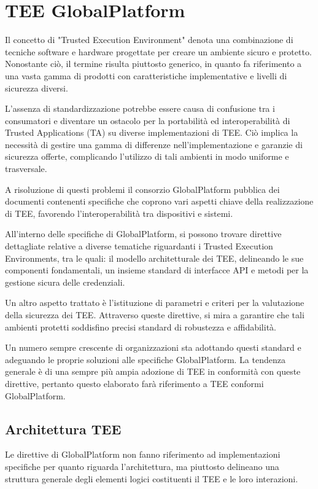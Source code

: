 \documentclass[12pt,italian]{report}
\begin{document}
	\newpage
	
	\section{TEE GlobalPlatform}
	\label{sec:GlobalPlatform}
	Il concetto di "Trusted Execution Environment" denota una combinazione di tecniche software e hardware progettate per creare un ambiente sicuro e protetto. Nonostante ciò, il termine risulta piuttosto generico, in quanto fa riferimento a una vasta gamma di prodotti con caratteristiche implementative e livelli di sicurezza diversi.
	
	L'assenza di standardizzazione potrebbe essere causa di confusione tra i consumatori e diventare un ostacolo per la portabilità ed interoperabilità di Trusted Applications (TA) su diverse implementazioni di TEE. Ciò implica la necessità di gestire una gamma di differenze nell'implementazione e garanzie di sicurezza offerte, complicando l'utilizzo di tali ambienti in modo uniforme e trasversale.
	
	A risoluzione di questi problemi il consorzio GlobalPlatform pubblica dei documenti contenenti specifiche che coprono vari aspetti chiave della realizzazione di TEE, favorendo l'interoperabilità tra dispositivi e sistemi.
	
	All'interno delle specifiche di GlobalPlatform, si possono trovare direttive dettagliate relative a diverse tematiche riguardanti i Trusted Execution Environments, tra le quali: il modello architetturale dei TEE, delineando le sue componenti fondamentali, un insieme standard di interfacce API e metodi per la gestione sicura delle credenziali.
	
	Un altro aspetto trattato è l'istituzione di parametri e criteri per la valutazione della sicurezza dei TEE. Attraverso queste direttive, si mira a garantire che tali ambienti protetti soddisfino precisi standard di robustezza e affidabilità.
	
	Un numero sempre crescente di organizzazioni sta adottando questi standard e adeguando le proprie soluzioni alle specifiche GlobalPlatform. La tendenza generale è di una sempre più ampia adozione di TEE in conformità con queste direttive, pertanto questo elaborato farà riferimento a TEE conformi GlobalPlatform.
	
	
	\bigbreak \noindent
	
	\subsection{Architettura TEE}
	\label{subsec:architettura}
 	Le direttive di GlobalPlatform non fanno riferimento ad implementazioni specifiche per quanto riguarda l'architettura, ma piuttosto delineano una struttura generale degli elementi logici costituenti il TEE e le loro interazioni.
 	
\end{document}
